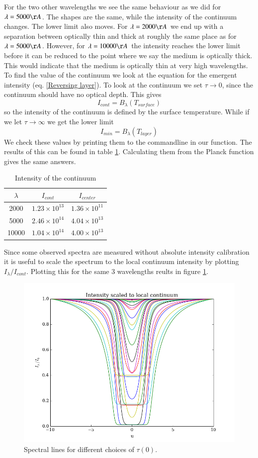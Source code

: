 \documentclass{aa}   %
\begin{document}
For the two other wavelengths we see the same behaviour as we did for $\lambda = 5000 \AA$. The shapes are the same, while the intensity of the continuum changes. The lower limit also moves. For $\lambda = 2000 \AA$ we end up with a separation between optically thin and thick at roughly the same place as for $\lambda = 5000 \AA$. However, for $\lambda = 10000 \AA$ the intensity reaches the lower limit before it can be reduced to the point where we say the medium is optically thick. This would indicate that the medium is optically thin at very high wavelengths. To find the value of the continuum we look at the equation for the emergent intensity (eq. \ref{Reversing layer}). To look at the continuum we set $\tau \rightarrow 0$, since the continuum should have no optical depth. This gives 
\begin{equation}
I_{cont}  = B_\lambda(T_{surface})
\end{equation}
so the intensity of the continuum is defined by the surface temperature.
While if we let $\tau \rightarrow \infty$ we get the lower limit
\begin{equation}
I_{min}  = B_\lambda(T_{layer})
\end{equation}
We check these values by printing them to the commandline in our function. The results of this can be found in table \ref{I_Cont}. Calculating them from the Planck function gives the same answers.
\begin{table}
\begin{center}
\begin{tabular}{| c | c | c |}
\hline
$\lambda$ & $I_{cont}$ & $I_{center}$\\
\hline
2000 & $1.23\times 10^{13}$ & $1.36\times 10^{11}$\\
\hline
5000 & $2.46\times 10^{14}$ & $4.04\times 10^{13}$\\
\hline
10000 & $1.04\times 10^{14}$ & $4.00\times 10^{13}$\\
\hline
\end{tabular}\label{I_Cont}
\caption{Intensity of the continuum}
\end{center}
\end{table}
Since some observed spectra are measured without absolute intensity calibration it is useful to scale the spectrum to the local continuum intensity by plotting $I_\lambda/I_{cont}$. Plotting this for the same 3 wavelengths reults in figure \ref{emergent_line_scaled_different}.
\begin{figure}[hbtp]
 \includegraphics[width=.49\textwidth]{emergent_line_scaled_different.png}
 \caption{Spectral lines for different choices of $\tau(0)$.}
 \label{emergent_line_scaled_different} 
\end{figure}
\end{document}
